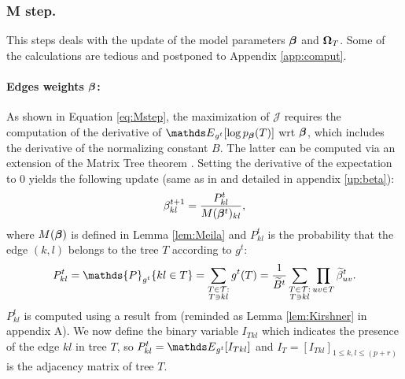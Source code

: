 \subsubsection*{M step.} This steps deals with the update of the  model parameters ${\boldsymbol{\beta}}$ and ${\boldsymbol{\Omega}}_T$. Some of the calculations are tedious and postponed to Appendix \ref{app:comput}.

\paragraph{Edges weights ${\boldsymbol{\beta}}$:} 
As shown in Equation \eqref{eq:Mstep}, the maximization of $\mathcal{J}$ requires the computation of the derivative of $\Esp_{g^t} [\log p_{\betabf}(T)]$ wrt ${\boldsymbol{\beta}}$, which includes the derivative of the normalizing constant $B$. The latter can be computed via an extension of the Matrix Tree theorem \citep[see][Lemma \ref{lem:Meila} reminded in Appendix \ref{app:tools}]{MeilaJaak}. Setting the derivative of the expectation to 0 yields the following update (same as in \citet{MRA20} and detailed in appendix \ref{up:beta}):
$$
\beta^{t+1}_{kl} 
= \frac{P^t_{kl}}{ M({\boldsymbol{\beta}}^t)_{kl}},
$$
where $M({\boldsymbol{\beta}})$ is defined in Lemma \ref{lem:Meila} and $P^t_{kl}$ is the probability that the edge $(k, l)$ belongs to the tree $T$ according to $g^t$:
$$
P^t_{kl} = \mathds{P}_{g^t}\{kl \in T\} 
= \sum_{\substack{T  \in \mathcal{T}: \\ T \ni kl}} g^t(T) 
= \frac{1}{\Bt^t} \sum_{\substack{T  \in \mathcal{T}: \\ T \ni kl}} \prod_{uv \in T} \betat^t_{uv}.
$$
$P^t_{kl}$ is computed using a result from \citet{kirshner} (reminded as Lemma \ref{lem:Kirshner} in appendix A). We now define the binary variable $I_{Tkl}$ which indicates the presence of the edge $kl$ in tree $T$, so $P_{kl}^t = \Esp_{g^t} [I_{Tkl}]$ and $I_T = [I_{Tkl}]_{1 \leq k, l \leq (p+r)}$ is the adjacency matrix of tree $T$.

